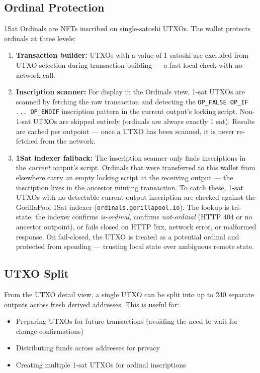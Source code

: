 \documentclass[a4paper, 11pt, openany]{book}
\begin{document}
\subsection{Ordinal Protection}

1Sat Ordinals are NFTs inscribed on single-satoshi UTXOs. The wallet protects ordinals at three levels:

\begin{enumerate}
\item \textbf{Transaction builder:} UTXOs with a value of 1 satoshi are excluded from UTXO selection during transaction building --- a fast local check with no network call.
\item \textbf{Inscription scanner:} For display in the Ordinals view, 1-sat UTXOs are scanned by fetching the raw transaction and detecting the \texttt{OP\_FALSE OP\_IF ... OP\_ENDIF} inscription pattern in the current output's locking script. Non-1-sat UTXOs are skipped entirely (ordinals are always exactly 1 sat). Results are cached per outpoint --- once a UTXO has been scanned, it is never re-fetched from the network.
\item \textbf{1Sat indexer fallback:} The inscription scanner only finds inscriptions in the \emph{current} output's script. Ordinals that were transferred to this wallet from elsewhere carry an empty locking script at the receiving output --- the inscription lives in the ancestor minting transaction. To catch these, 1-sat UTXOs with no detectable current-output inscription are checked against the GorillaPool 1Sat indexer (\texttt{ordinals.gorillapool.io}). The lookup is tri-state: the indexer confirms \emph{is-ordinal}, confirms \emph{not-ordinal} (HTTP 404 or no ancestor outpoint), or fails closed on HTTP 5xx, network error, or malformed response. On fail-closed, the UTXO is treated as a potential ordinal and protected from spending --- trusting local state over ambiguous remote state.
\end{enumerate}

\subsection{UTXO Split}

From the UTXO detail view, a single UTXO can be split into up to 240 separate outputs across fresh derived addresses. This is useful for:

\begin{itemize}
\item Preparing UTXOs for future transactions (avoiding the need to wait for change confirmations)
\item Distributing funds across addresses for privacy
\item Creating multiple 1-sat UTXOs for ordinal inscriptions
\end{itemize}
\end{document}
